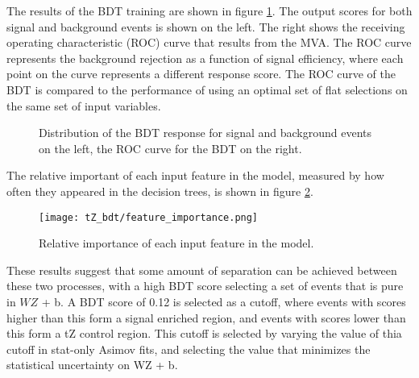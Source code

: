 The results of the BDT training are shown in figure \ref{fig:tZ_bdt}. The output scores for both signal and background events is shown on the left. The right shows the receiving operating characteristic (ROC) curve that results from the MVA. The ROC curve represents the background rejection as a function of signal efficiency, where each point on the curve represents a different response score. The ROC curve of the BDT is compared to the performance of using an optimal set of flat selections on the same set of input variables.

\begin{figure}[H] 
\center
    \caption{Distribution of the BDT response for signal and background events on the left, the ROC curve for the BDT on the right.}
    \label{fig:tZ_bdt}
\end{figure}

The relative important of each input feature in the model, measured by how often they appeared in the decision trees, is shown in figure \ref{fig:tZ_fImp}.

\begin{figure}[H] 
\center
        \texttt{[image: tZ\_bdt/feature\_importance.png]}
        \caption{Relative importance of each input feature in the model.}
        \label{fig:tZ_fImp}
\end{figure}

These results suggest that some amount of separation can be achieved between these two processes, with a high BDT score selecting a set of events that is pure in $WZ$ + b. A BDT score of 0.12 is selected as a cutoff, where events with scores higher than this form a signal enriched region, and events with scores lower than this form a tZ control region. This cutoff is selected by varying the value of thia cutoff in stat-only Asimov fits, and selecting the value that minimizes the statistical uncertainty on WZ + b.

